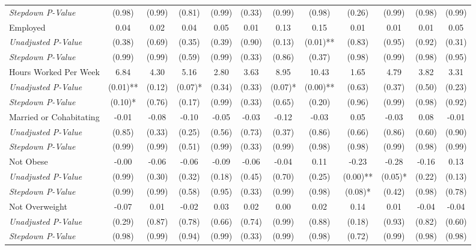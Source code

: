 \begin{tabular}{l c c c c c c c c c c c}
\quad \textit{Stepdown P-Value} & (0.98) & (0.99) & (0.81) & (0.99) & (0.33) & (0.99) & (0.98) & (0.26) & (0.99) & (0.98) & (0.99) \\
Employed & 0.04 & 0.02 & 0.04 & 0.05 & 0.01 & 0.13 & 0.15 & 0.01 & 0.01 & 0.01 & 0.05 \\
\quad \textit{Unadjusted P-Value} & (0.38) & (0.69) & (0.35) & (0.39) & (0.90) & (0.13) & (0.01)** & (0.83) & (0.95) & (0.92) & (0.31) \\
\quad \textit{Stepdown P-Value} & (0.99) & (0.99) & (0.59) & (0.99) & (0.33) & (0.86) & (0.37) & (0.98) & (0.99) & (0.98) & (0.95) \\
Hours Worked Per Week & 6.84 & 4.30 & 5.16 & 2.80 & 3.63 & 8.95 & 10.43 & 1.65 & 4.79 & 3.82 & 3.31 \\
\quad \textit{Unadjusted P-Value} & (0.01)** & (0.12) & (0.07)* & (0.34) & (0.33) & (0.07)* & (0.00)** & (0.63) & (0.37) & (0.50) & (0.23) \\
\quad \textit{Stepdown P-Value} & (0.10)* & (0.76) & (0.17) & (0.99) & (0.33) & (0.65) & (0.20) & (0.96) & (0.99) & (0.98) & (0.92) \\
Married or Cohabitating & -0.01 & -0.08 & -0.10 & -0.05 & -0.03 & -0.12 & -0.03 & 0.05 & -0.03 & 0.08 & -0.01 \\
\quad \textit{Unadjusted P-Value} & (0.85) & (0.33) & (0.25) & (0.56) & (0.73) & (0.37) & (0.86) & (0.66) & (0.86) & (0.60) & (0.90) \\
\quad \textit{Stepdown P-Value} & (0.99) & (0.99) & (0.51) & (0.99) & (0.33) & (0.99) & (0.98) & (0.98) & (0.99) & (0.98) & (0.99) \\
Not Obese & -0.00 & -0.06 & -0.06 & -0.09 & -0.06 & -0.04 & 0.11 & -0.23 & -0.28 & -0.16 & 0.13 \\
\quad \textit{Unadjusted P-Value} & (0.99) & (0.30) & (0.32) & (0.18) & (0.45) & (0.70) & (0.25) & (0.00)** & (0.05)* & (0.22) & (0.13) \\
\quad \textit{Stepdown P-Value} & (0.99) & (0.99) & (0.58) & (0.95) & (0.33) & (0.99) & (0.98) & (0.08)* & (0.42) & (0.98) & (0.78) \\
Not Overweight & -0.07 & 0.01 & -0.02 & 0.03 & 0.02 & 0.00 & 0.02 & 0.14 & 0.01 & -0.04 & -0.04 \\
\quad \textit{Unadjusted P-Value} & (0.29) & (0.87) & (0.78) & (0.66) & (0.74) & (0.99) & (0.88) & (0.18) & (0.93) & (0.82) & (0.60) \\
\quad \textit{Stepdown P-Value} & (0.98) & (0.99) & (0.94) & (0.99) & (0.33) & (0.99) & (0.98) & (0.72) & (0.99) & (0.98) & (0.98) \\

\end{tabular}
